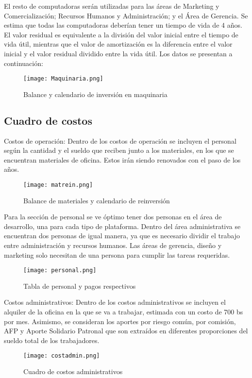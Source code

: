 \documentclass[11pt]{article}
\begin{document}
    El resto de computadoras serán utilizadas para las áreas de Marketing y Comercialización; Recursos Humanos y Administración; y el Área de Gerencia. Se estima que todas las computadoras deberían tener un tiempo de vida de 4 años. El valor residual es equivalente a la división del valor inicial entre el tiempo de vida útil, mientras que el valor de amortización es la diferencia entre el valor inicial y el valor residual dividido entre la vida útil. Los datos se presentan a continuación:

           \begin{figure}[H]
            \centering
            \texttt{[image: Maquinaria.png]}
            \caption{Balance y calendario de inversión en maquinaria}
            \label{maquinaria}
        \end{figure}
    
    \newpage    
    \subsection{Cuadro de costos}
    Costos de operación:
    Dentro de los costos de operación se incluyen el personal según la cantidad y el sueldo que reciben junto a los materiales, en los que se encuentran materiales de oficina. Estos irán siendo renovados con el paso de los años.
    \begin{figure}[H]
            \centering
            \texttt{[image: matrein.png]}
            \caption{Balance de materiales y calendario de reinversión}
            \label{calendario reinversion}
        \end{figure}
    
    Para la sección de personal se ve óptimo tener dos personas en el área de desarrollo, una para cada tipo de plataforma. Dentro del área administrativa se encuentran dos personas de igual manera, ya que es necesario dividir el trabajo entre administración y recursos humanos. Las áreas de gerencia, diseño y marketing solo necesitan de una persona para cumplir las tareas requeridas.

    \begin{figure}[H]
            \centering
            \texttt{[image: personal.png]}
            \caption{Tabla de personal y pagos respectivos}
            \label{personal}
        \end{figure}
        
        
        
    Costos administrativos:
    Dentro de los costos administrativos se incluyen el alquiler de la oficina en la que se va a trabajar, estimada con un costo de 700 bs por mes. Asimismo, se consideran los aportes por riesgo común, por comisión, AFP y Aporte Solidario Patronal que son extraídos en diferentes proporciones del sueldo total de los trabajadores.

    \begin{figure}[H]
            \centering
            \texttt{[image: costadmin.png]}
            \caption{Cuadro de costos administrativos}
            \label{personal}
        \end{figure}
\end{document}

